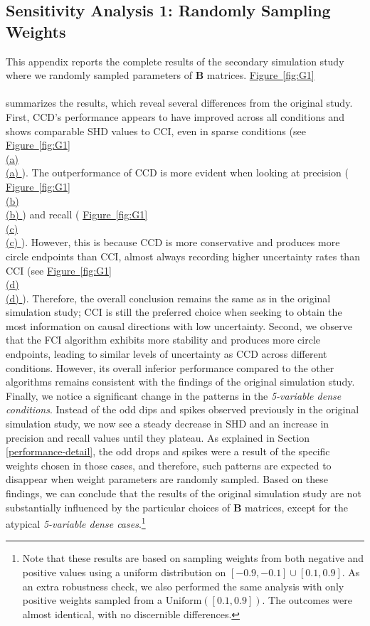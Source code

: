 \documentclass[twoside, 11pt]{article}
\newcommand*{\figref}[2][]{%
  \hyperref[{fig:#2}]{%
    Figure~\ref*{fig:#2}%
    \ifx\\#1\\%
    \else
      #1%
    \fi
  }%
}
\begin{document}
\begin{appendices}
\section{Sensitivity Analysis 1: Randomly Sampling Weights}\label{varyingbeta}
This appendix reports the complete results of the secondary simulation study where we randomly sampled parameters of $\mathbf{B}$ matrices. \figref[]{G1} summarizes the results, which reveal several differences from the original study. First, CCD's performance appears to have improved across all conditions and shows comparable SHD values to CCI, even in sparse conditions (see \figref[(a)]{G1}). The outperformance of CCD is more evident when looking at precision (\figref[(b)]{G1}) and recall (\figref[(c)]{G1}). However, this is because CCD is more conservative and produces more circle endpoints than CCI, almost always recording higher uncertainty rates than CCI (see \figref[(d)]{G1}). Therefore, the overall conclusion remains the same as in the original simulation study; CCI is still the preferred choice when seeking to obtain the most information on causal directions with low uncertainty. Second, we observe that the FCI algorithm exhibits more stability and produces more circle endpoints, leading to similar levels of uncertainty as CCD across different conditions. However, its overall inferior performance compared to the other algorithms remains consistent with the findings of the original simulation study. Finally, we notice a significant change in the patterns in the \textit{5-variable dense conditions}. Instead of the odd dips and spikes observed previously in the original simulation study, we now see a steady decrease in SHD and an increase in precision and recall values until they plateau. As explained in Section \ref{performance-detail}, the odd drops and spikes were a result of the specific weights chosen in those cases, and therefore, such patterns are expected to disappear when weight parameters are randomly sampled. Based on these findings, we can conclude that the results of the original simulation study are not substantially influenced by the particular choices of $\mathbf{B}$ matrices, except for the atypical \textit{5-variable dense cases}.\footnote{Note that these results are based on sampling weights from both negative and positive values using a uniform distribution on $[-0.9, -0.1] \cup [0.1,  0.9]$. As an extra robustness check, we also performed the same analysis with only positive weights sampled from a $\text{Uniform}([0.1, 0.9])$. The outcomes were almost identical, with no discernible differences.}


\end{appendices}
\end{document}
